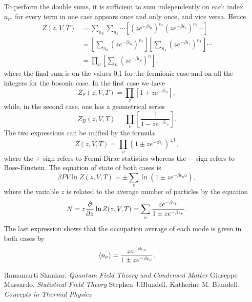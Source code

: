 \documentclass[10pt]{article}
\begin{document}
	To perform the double sums, it is sufficient to sum independently on each index $n_\nu$, for every term in one case appears once and only once, and vice versa. Hence
	$$\begin{aligned}
	Z(z,V,T)&=\sum_{n_0}\sum_{n_1}\cdots\left[(ze^{-\beta \epsilon_0})^{n_0}(ze^{-\beta \epsilon_1})^{n_1}\cdots\right]\\
	&=\left[\sum_{n_0}(ze^{-\beta\epsilon_0})^{n_0}\right]\left[\sum_{n_1}(ze^{-\beta \epsilon_1})^{n_1}\right]\cdots\\
	&=\prod_\nu\left[\sum_n(ze^{-\beta\epsilon_\nu})^n\right],
	\end{aligned}$$
	where the final sum is on the values 0,1 for the fermionic case and on all the integers for the bosonic case. In the first case we have 
	$$Z_F(z,V,T)=\prod_\nu[1+ze^{-\beta\epsilon_\nu}],$$
	while, in the second case, one has a geometrical series
	$$Z_B(z,V,T)=\prod_\nu\left[\frac{1}{1-ze^{-\beta\epsilon_\nu}}\right].$$
	The two expressions can be unified by the formula 
	$$Z(z,V,T)=\prod_\nu(1\pm ze^{-\beta\epsilon_\nu})^{\pm 1},$$
	where the $+$ sign refers to Fermi-Dirac statistics whereas the $-$ sign refers to Bose-Einstein. The equation of state of both cases is 
	$$\beta PV\ln Z(z,V,T)=\pm\sum_\nu\ln(1\pm ze^{-\beta\epsilon_nu}),$$
	where the variable $z$ is related to the average number of particles by the equation 
	$$N=z\pdv{}{z}\ln Z(z,V,T)=\sum_\nu\frac{ze^{-\beta\epsilon_\nu}}{1\pm ze^{-\beta\epsilon_\nu}}.$$
	The last expression shows that the occupation average of each mode is given in both cases by 
	$$\expval{n_\nu}=\frac{ze^{-\beta\epsilon_\nu}}{1\pm ze^{-\beta
			\epsilon_\nu}}.$$ 
\begin{thebibliography}{99}
{\footnotesize
{}
Ramamurti Shankar. \emph{Quantum Field Theory and Condensed Matter}
Giuseppe Mussardo. \emph{Statistical Field Theory}
Stephen J.Blundell, Katherine M. Blundell. \emph{Concepts in Thermal Physics} 

}
\end{thebibliography}	
	
	
	
	 
 
\end{document}
